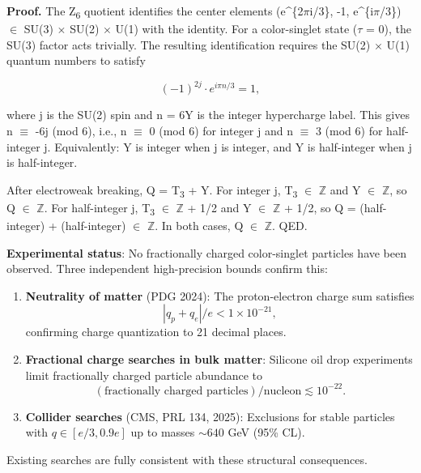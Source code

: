 \textbf{Proof.} The Z\textsubscript{6} quotient identifies the center elements (e\^{}\{2\ensuremath{\pi}i/3\}, -1, e\^{}\{i\ensuremath{\pi}/3\}) \ensuremath{\in} SU(3) \ensuremath{\times} SU(2) \ensuremath{\times} U(1) with the identity. For a color-singlet state (\ensuremath{\tau} = 0), the SU(3) factor acts trivially. The resulting identification requires the SU(2) \ensuremath{\times} U(1) quantum numbers to satisfy

\[
(-1)^{2j} \cdot e^{i\pi n/3} = 1,
\]

where j is the SU(2) spin and n = 6Y is the integer hypercharge label. This gives n \ensuremath{\equiv} -6j (mod 6), i.e., n \ensuremath{\equiv} 0 (mod 6) for integer j and n \ensuremath{\equiv} 3 (mod 6) for half-integer j. Equivalently: Y is integer when j is integer, and Y is half-integer when j is half-integer.

After electroweak breaking, Q = T\textsubscript{3} + Y. For integer j, T\textsubscript{3} \ensuremath{\in} \ensuremath{\mathbb{Z}} and Y \ensuremath{\in} \ensuremath{\mathbb{Z}}, so Q \ensuremath{\in} \ensuremath{\mathbb{Z}}. For half-integer j, T\textsubscript{3} \ensuremath{\in} \ensuremath{\mathbb{Z}} + 1/2 and Y \ensuremath{\in} \ensuremath{\mathbb{Z}} + 1/2, so Q = (half-integer) + (half-integer) \ensuremath{\in} \ensuremath{\mathbb{Z}}. In both cases, Q \ensuremath{\in} \ensuremath{\mathbb{Z}}. QED.

\textbf{Experimental status}: No fractionally charged color-singlet particles have been observed. Three independent high-precision bounds confirm this:

\begin{enumerate}
\def\labelenumi{\arabic{enumi}.}
\item
  \textbf{Neutrality of matter} (PDG 2024): The proton-electron charge sum satisfies \[|q_p + q_e|/e < 1 \times 10^{-21},\] confirming charge quantization to 21 decimal places.
\item
  \textbf{Fractional charge searches in bulk matter}: Silicone oil drop experiments limit fractionally charged particle abundance to \[(\text{fractionally charged particles})/\text{nucleon} \lesssim 10^{-22}.\]
\item
  \textbf{Collider searches} (CMS, PRL 134, 2025): Exclusions for stable particles with \(q \in [e/3, 0.9e]\) up to masses \(\sim 640\) GeV (95\% CL).
\end{enumerate}

Existing searches are fully consistent with these structural consequences.

